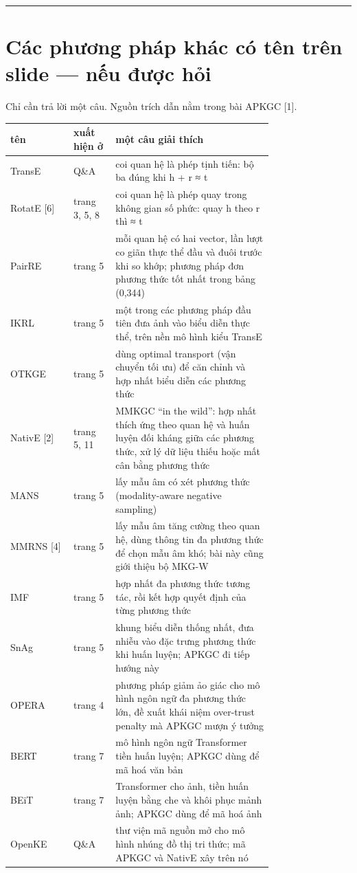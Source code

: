\documentclass[11pt,a4paper]{article}
\begin{document}
\medskip\noindent\rule{\linewidth}{0.3pt}\medskip

\newpage
\section*{Các phương pháp khác có tên trên slide --- nếu được hỏi}

Chỉ cần trả lời một câu. Nguồn trích dẫn nằm trong bài APKGC [1].


\begin{center}\small
\begin{tabular}{@{}lp{0.16\linewidth}p{0.6\linewidth}@{}}
\toprule
\textbf{tên} & \textbf{xuất hiện ở} & \textbf{một câu giải thích} \\ \midrule
TransE & Q\&A & coi quan hệ là phép tịnh tiến: bộ ba đúng khi h + r ≈ t \\
RotatE [6] & trang 3, 5, 8 & coi quan hệ là phép quay trong không gian số phức: quay h theo r thì ≈ t \\
PairRE & trang 5 & mỗi quan hệ có hai vector, lần lượt co giãn thực thể đầu và đuôi trước khi so khớp; phương pháp đơn phương thức tốt nhất trong bảng (0,344) \\
IKRL & trang 5 & một trong các phương pháp đầu tiên đưa ảnh vào biểu diễn thực thể, trên nền mô hình kiểu TransE \\
OTKGE & trang 5 & dùng optimal transport (vận chuyển tối ưu) để căn chỉnh và hợp nhất biểu diễn các phương thức \\
NativE [2] & trang 5, 11 & MMKGC ``in the wild'': hợp nhất thích ứng theo quan hệ và huấn luyện đối kháng giữa các phương thức, xử lý dữ liệu thiếu hoặc mất cân bằng phương thức \\
MANS & trang 5 & lấy mẫu âm có xét phương thức (modality-aware negative sampling) \\
MMRNS [4] & trang 5 & lấy mẫu âm tăng cường theo quan hệ, dùng thông tin đa phương thức để chọn mẫu âm khó; bài này cũng giới thiệu bộ MKG-W \\
IMF & trang 5 & hợp nhất đa phương thức tương tác, rồi kết hợp quyết định của từng phương thức \\
SnAg & trang 5 & khung biểu diễn thống nhất, đưa nhiễu vào đặc trưng phương thức khi huấn luyện; APKGC đi tiếp hướng này \\
OPERA & trang 4 & phương pháp giảm ảo giác cho mô hình ngôn ngữ đa phương thức lớn, đề xuất khái niệm over-trust penalty mà APKGC mượn ý tưởng \\
BERT & trang 7 & mô hình ngôn ngữ Transformer tiền huấn luyện; APKGC dùng để mã hoá văn bản \\
BEiT & trang 7 & Transformer cho ảnh, tiền huấn luyện bằng che và khôi phục mảnh ảnh; APKGC dùng để mã hoá ảnh \\
OpenKE & Q\&A & thư viện mã nguồn mở cho mô hình nhúng đồ thị tri thức; mã APKGC và NativE xây trên nó \\
\bottomrule
\end{tabular}
\end{center}
\end{document}
